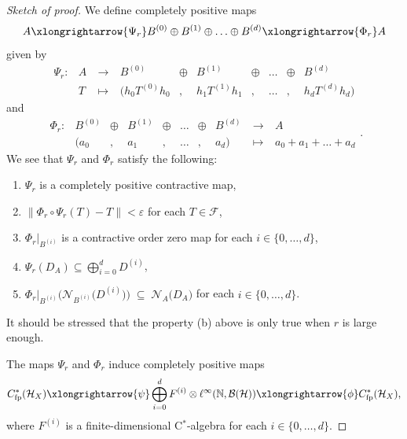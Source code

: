 \documentclass[a4paper]{amsart}
\newcommand{\myhyp}{\textnormal{-}\hskip0pt\relax}
\numberwithin{equation}{section}
\newcommand{\N}{\mathbb{N}}
\newcommand{\Bcal}{\mathcal{B}}
\newcommand{\Fcal}{\mathcal{F}}
\newcommand{\Hcal}{\mathcal{H}}
\newcommand{\e}{\varepsilon}
\newcommand{\cstar}{C$^\ast$\myhyp{}algebra}
\newcommand{\bop}[1]{\Bcal({#1})}
\newcommand{\Cfp}[1]{C^{\ast}_{\mathrm{fp}}({#1})}
\newcommand{\rAr}{\longrightarrow}
\newcommand{\prn}[1]{{(#1)}}
\newcommand{\normreg}[1]{{\lVert #1  \rVert}}
\newcommand{\normalisers}[2]{{\mathcal{N}}_{#2}{\big({#1}\big)}}
\theoremstyle{plain}
\theoremstyle{indented}
\numberwithin{equation}{section}
\theoremstyle{definition}
\theoremstyle{remark}
\theoremstyle{plain}
\theoremstyle{definition}
\begin{document}
\begin{proof}[Sketch of proof]
    We define completely positive maps
    \begin{equation} \label{eq:upperBoundAsdimApprox1}
        A 
        \xlongrightarrow{  \Psi_r}  
       B^{(0)} \oplus B^{(1)} \oplus \hdots \oplus B^{(d)} 
        \xlongrightarrow{ \Phi_r } 
         A
    \end{equation}
    given by
    \[\begin{array}{cccccccccc}
         \Psi_r \colon 
         & A 
         &~\rAr~
         & B^{(0)} 
         & \oplus 
         & B^{(1)} 
         & \oplus & \hdots & \oplus 
         & B^{(d)}\\
         & T 
         &~\longmapsto~
         & (h_0 T^{\prn{0}} h_0
         &  ,
         & h_1 T^{\prn{1}} h_1 
         & ,
         & \hdots & ,
         & h_d T^{\prn{d}} h_d )
     \end{array}\]
     and
         \[ \begin{array}{cccccccccc}
         \Phi_r  \colon & B^{(0)} & \oplus & B^{(1)} & \oplus & \hdots & \oplus & B^{(d)} &~\rAr~& A \\
        & (a_0 & , & a_1 & , & \hdots & , & a_d)
        &~\longmapsto~& a_0 + a_1 + \hdots + a_d    
     \end{array}.
\]
    We see that ${\Psi_r}$ and ${\Phi_r}$ satisfy the following:
    \begin{enumerate} \renewcommand{\labelenumi}{(\alph{enumi})}
        \item \label{eq:upperBoundCPAlgPropa} $\Psi_r$ is a completely positive contractive map,
        \item \label{eq:upperBoundCPAlgPropb} ${\normreg{\Phi_r \circ \Psi_r(T) - T} < \e}$ for each ${T \in \Fcal}$,
        \item \label{eq:upperBoundCPAlgPropc}$\Phi_r|_{B^{(i)}}$ is a contractive order zero map for each ${i \in \{0,\hdots,d\}}$,
        \item \label{eq:upperBoundCPAlgPropd} ${\Psi_r(D_A) \subseteq \bigoplus_{i=0}^d D^{\prn{i}}}$,
        \item \label{eq:upperBoundCPAlgPrope} ${\Phi_r|_{B^{(i)}} \big( \normalisers{D^{(i)}}{B^{(i)} } \big) \; \subseteq  \; \normalisers{D_A }{ A}}$ for each ${i \in \{0,\hdots,d\}}$.
    \end{enumerate}
    It should be stressed that the property (b) above is only true when $r$ is large enough.
    
    The maps ${\Psi_r}$ and ${\Phi_r}$ induce completely positive maps
    \begin{equation*}
        \Cfp{\Hcal_X} 
        \xlongrightarrow{ \psi}  
       \bigoplus_{i=0}^d F^{(i)} \otimes \ell^\infty(\N, \bop{\Hcal})
        \xlongrightarrow{\phi } 
         \Cfp{\Hcal_X},
    \end{equation*}
    where ${F^{(i)}}$ is a finite\myhyp{}dimensional \cstar{} for each ${i \in \{0, \hdots, d\}}$.


\end{proof}
\end{document}
